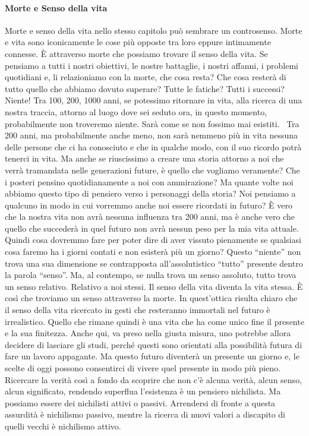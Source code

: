 \documentclass[12pt]{book} %
\begin{document}
\paragraph{Morte e Senso della vita }
Morte e senso della vita nello stesso capitolo può sembrare un controsenso. Morte e vita sono iconicamente le cose più
opposte tra loro eppure intimamente connesse. È attraverso morte che possiamo trovare il senso della vita. Se pensiamo
a tutti i nostri obiettivi, le nostre battaglie, i nostri affanni, i problemi quotidiani e, li relazioniamo con la
morte, che cosa resta? Che cosa resterà di tutto quello che abbiamo dovuto superare? Tutte le fatiche? Tutti i
successi? Niente! Tra 100, 200, 1000 anni, se potessimo ritornare in vita, alla ricerca di una nostra traccia, attorno
al luogo dove sei seduto ora, in questo momento, probabilmente non troveremo niente. Sarà come se non fossimo mai
esistiti. \ Tra 200 anni, ma probabilmente anche meno, non sarà nemmeno più in vita nessuna delle persone che ci ha
conosciuto e che in qualche modo, con il suo ricordo potrà tenerci in vita. Ma anche se riuscissimo a creare una storia
attorno a noi che verrà tramandata nelle generazioni future, è quello che vogliamo veramente? Che i posteri pensino
quotidianamente a noi con ammirazione? Ma quante volte noi abbiamo questo tipo di pensiero verso i personaggi della
storia? Noi pensiamo a qualcuno in modo in cui vorremmo anche noi essere ricordati in futuro? È vero che la nostra vita
non avrà nessuna influenza tra 200 anni, ma è anche vero che quello che succederà in quel futuro non avrà nessun peso
per la mia vita attuale. Quindi cosa dovremmo fare per poter dire di aver vissuto pienamente se qualsiasi cosa faremo
ha i giorni contati e non esisterà più un giorno? Questo “niente” non trova una sua dimensione se contrapposta
all'assolutistico “tutto” presente dentro la parola “senso”. Ma, al contempo, se nulla trova un
senso assoluto, tutto trova un senso relativo. Relativo a noi stessi. Il senso della vita diventa la vita stessa. È
così che troviamo un senso attraverso la morte. In quest'ottica risulta chiaro che il senso della
vita ricercato in gesti che resteranno immortali nel futuro è irrealistico. Quello che rimane quindi è una vita che ha
come unico fine il presente e la sua finitezza. Anche qui, va preso nella giusta misura, uno potrebbe allora decidere
di lasciare gli studi, perché questi sono orientati alla possibilità futura di fare un lavoro appagante. Ma questo
futuro diventerà un presente un giorno e, le scelte di oggi possono consentirci di vivere quel presente in modo più
pieno. Ricercare la verità così a fondo da scoprire che non c'è alcuna verità, alcun senso, alcun
significato, rendendo superflua l'esistenza è un pensiero nichilista. Ma possiamo essere dei
nichilisti attivi o passivi. Arrendersi di fronte a questa assurdità è nichilismo passivo, mentre la ricerca di nuovi
valori a discapito di quelli vecchi è nichilismo attivo.
\end{document}
